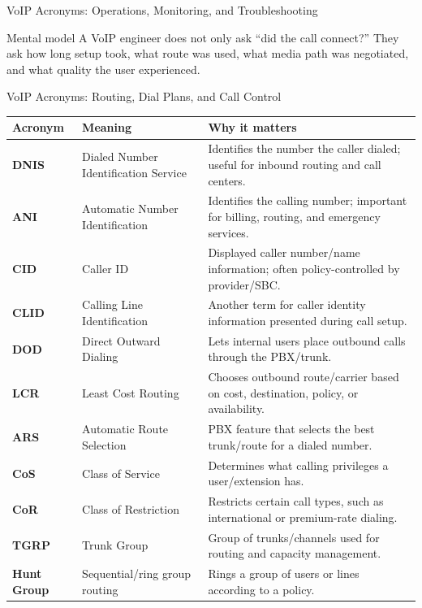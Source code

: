 \documentclass[aspectratio=169]{beamer}
\begin{document}
\begin{frame}{VoIP Acronyms: Operations, Monitoring, and Troubleshooting}
\vspace{0.15cm}

\begin{block}{Mental model}
A VoIP engineer does not only ask ``did the call connect?'' They ask how long setup took, what route was used, what media path was negotiated, and what quality the user experienced.
\end{block}

\end{frame}


\begin{frame}{VoIP Acronyms: Routing, Dial Plans, and Call Control}
\tiny

\begin{tabular}{p{1.8cm} p{3.5cm} p{6.8cm}}
\toprule
\textbf{Acronym} & \textbf{Meaning} & \textbf{Why it matters} \\
\midrule
\textbf{DNIS} & Dialed Number Identification Service & Identifies the number the caller dialed; useful for inbound routing and call centers. \\
\textbf{ANI} & Automatic Number Identification & Identifies the calling number; important for billing, routing, and emergency services. \\
\textbf{CID} & Caller ID & Displayed caller number/name information; often policy-controlled by provider/SBC. \\
\textbf{CLID} & Calling Line Identification & Another term for caller identity information presented during call setup. \\
\textbf{DOD} & Direct Outward Dialing & Lets internal users place outbound calls through the PBX/trunk. \\
\textbf{LCR} & Least Cost Routing & Chooses outbound route/carrier based on cost, destination, policy, or availability. \\
\textbf{ARS} & Automatic Route Selection & PBX feature that selects the best trunk/route for a dialed number. \\
\textbf{CoS} & Class of Service & Determines what calling privileges a user/extension has. \\
\textbf{CoR} & Class of Restriction & Restricts certain call types, such as international or premium-rate dialing. \\
\textbf{TGRP} & Trunk Group & Group of trunks/channels used for routing and capacity management. \\
\textbf{Hunt Group} & Sequential/ring group routing & Rings a group of users or lines according to a policy. \\

\end{tabular}
\end{frame}
\end{document}
